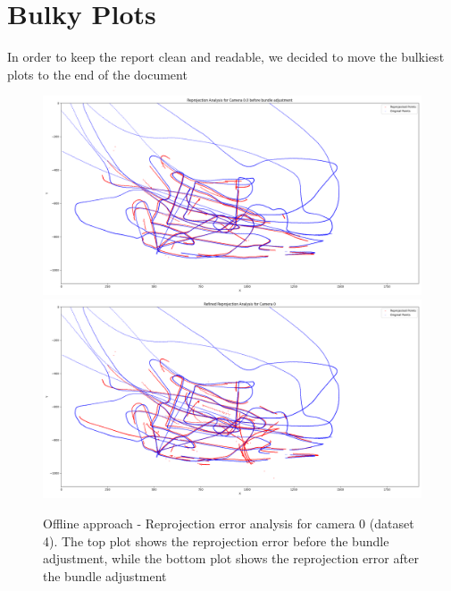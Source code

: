 \documentclass[11pt]{article}
\begin{document}
\section*{Bulky Plots}

In order to keep the report clean and readable, we decided to move the bulkiest plots to the end of the document

\begin{figure}[h]
    \centering
    \includegraphics[width=\textwidth]{../plots/dataset4/reprojection_analysis_camera_0_before_ba_.png}
    \includegraphics[width=\textwidth]{../plots/dataset4/reprojection_analysis_camera_0.png}
    \caption{Offline approach - Reprojection error analysis for camera 0 (dataset 4). The top plot shows the reprojection error before the bundle adjustment, while the bottom plot shows the reprojection error after the bundle adjustment}
    \label{fig:reprojection_analysis}
\end{figure}
\end{document}
